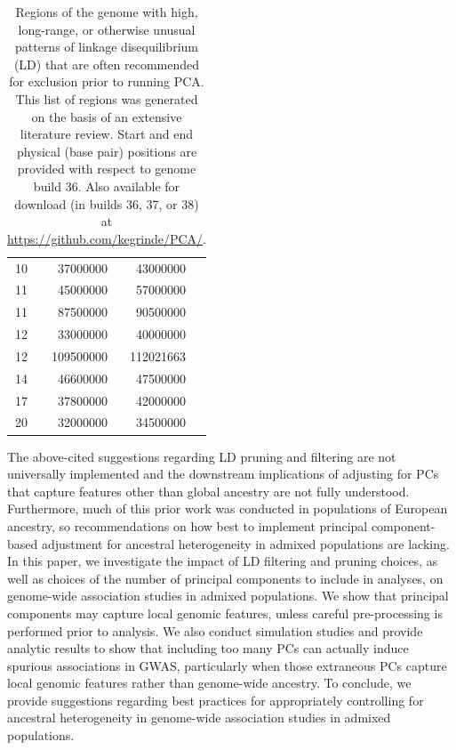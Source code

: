 \documentclass[12pt]{article}
\begin{document}
\begin{table}
\begin{tabular}{crrl}
10  &  37000000    &    43000000   &    \citep{anderson2010, price2008, weale2010}  \\
11   & 45000000    &    57000000   &    \citep{fellay2007, price2008, weale2010} \\
11   & 87500000    &    90500000   &    \citep{anderson2010, price2008, weale2010}  \\
12   & 33000000    &    40000000   &    \citep{anderson2010, price2008, weale2010} \\
12   & 109500000   &    112021663   &    \citep{price2008, weale2010} \\
14   & 46600000    &    47500000   &    \citep{prive2018} \\
17   & 37800000    &    42000000    &   \citep{novembre2008, conomos2016} \\
20   & 32000000   &     34500000    &   \citep{anderson2010, price2008, weale2010}  \\
\end{tabular}
\caption{Regions of the genome with high, long-range, or otherwise unusual patterns of linkage disequilibrium (LD) that are often recommended for exclusion prior to running PCA. This list of regions was generated on the basis of an extensive literature review. Start and end physical (base pair) positions are provided with respect to genome build 36. Also available for download (in builds 36, 37, or 38) at \href{github.com/kegrinde/PCA}{https://github.com/kegrinde/PCA/}.}
\label{tab:highLD}
\end{table}


The above-cited suggestions regarding LD pruning and filtering are not universally implemented and the downstream implications of adjusting for PCs that capture features other than global ancestry are not fully understood.
Furthermore, much of this prior work was conducted in populations of European ancestry, so recommendations on how best to implement principal component-based adjustment for ancestral heterogeneity in admixed populations are lacking. 
In this paper, we investigate the impact of LD filtering and pruning choices, as well as choices of the number of principal components to include in analyses, on genome-wide association studies in admixed populations.
We show that principal components may capture local genomic features, unless careful pre-processing is performed prior to analysis.
We also conduct simulation studies and provide analytic results to show that including too many PCs can actually induce spurious associations in GWAS, particularly when those extraneous PCs capture local genomic features rather than genome-wide ancestry.
To conclude, we provide suggestions regarding best practices for appropriately controlling for ancestral heterogeneity in genome-wide association studies in admixed populations.
\end{document}
